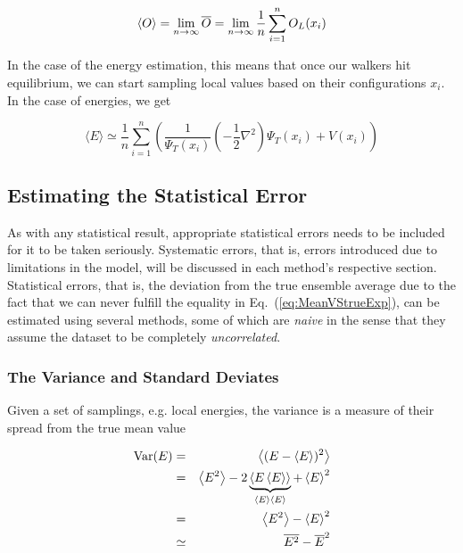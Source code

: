 \begin{equation}
 \label{eq:MeanVStrueExp}
 \left< O \right> = \lim_{n\to\infty} \overline{O} = \lim_{n\to\infty}\frac{1}{n}\sum_{i=1}^n O_L(x_i)
\end{equation}


In the case of the energy estimation, this means that once our walkers hit equilibrium, we can start sampling local values based on their configurations $x_i$. In the case of energies, we get

\begin{equation}
 \langle E \rangle \simeq \frac{1}{n}\sum_{i=1}^n \left(\frac{1}{\Psi_T(x_i)}\left(-\frac{1}{2}\nabla^2\right)\Psi_T(x_i) + V(x_i)\right)
\end{equation}

\subsection{Estimating the Statistical Error}

As with any statistical result, appropriate statistical errors needs to be included for it to be taken seriously. Systematic errors, that is, errors introduced due to limitations in the model, will be discussed in each method's respective section. Statistical errors, that is, the  deviation from the true ensemble average due to the fact that we can never fulfill the equality in Eq.~(\ref{eq:MeanVStrueExp}), can be estimated using several methods, some of which are \textit{naive} in the sense that they assume the dataset to be completely \textit{uncorrelated}. 



\subsubsection{The Variance and Standard Deviates}

Given a set of samplings, e.g. local energies, the variance is a measure of their spread from the true mean value

\begin{eqnarray}
\label{eq:variance}
\mathrm{Var}(E) &=& \left< (E-\left< E \right>)^2 \right> \nonumber\\
        &=& \left< E^2 \right> - 2\underbrace{\left< E\left< E \right> \right>}_{\left< E \right>\left< E \right>} + \left< E \right>^2 \nonumber\\
        &=& \left< E^2 \right> - \left< E \right>^2 \\
        &\simeq& \overline{E^2} - \overline{E}^2
\end{eqnarray}

